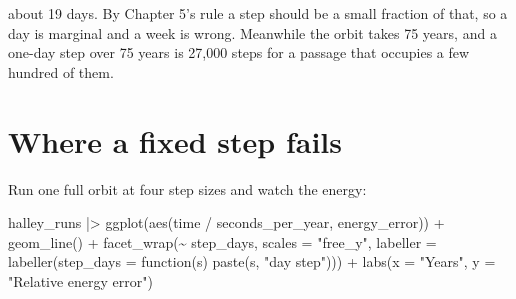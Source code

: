 \documentclass[
  10.5pt,
  letterpaper,
]{scrbook}
\newenvironment{Shaded}{\begin{snugshade}}{\end{snugshade}}
\newcommand{\AttributeTok}[1]{\textcolor[rgb]{0.00,0.00,0.00}{#1}}
\newcommand{\ControlFlowTok}[1]{\textcolor[rgb]{0.00,0.00,0.00}{#1}}
\newcommand{\DecValTok}[1]{\textcolor[rgb]{0.00,0.00,0.00}{#1}}
\newcommand{\FunctionTok}[1]{\textcolor[rgb]{0.00,0.00,0.00}{#1}}
\newcommand{\NormalTok}[1]{\textcolor[rgb]{0.00,0.00,0.00}{#1}}
\newcommand{\OtherTok}[1]{\textcolor[rgb]{0.00,0.00,0.00}{#1}}
\newcommand{\SpecialCharTok}[1]{\textcolor[rgb]{0.00,0.00,0.00}{#1}}
\newcommand{\StringTok}[1]{\textcolor[rgb]{0.00,0.00,0.00}{#1}}
\theoremstyle{plain}
\theoremstyle{remark}
\begin{document}
about 19 days. By Chapter 5's rule a step should be a small fraction of
that, so a day is marginal and a week is wrong. Meanwhile the orbit
takes 75 years, and a one-day step over 75 years is 27,000 steps for a
passage that occupies a few hundred of them.

\section{Where a fixed step fails}\label{where-a-fixed-step-fails}

Run one full orbit at four step sizes and watch the energy:

\begin{Shaded}
\end{Shaded}

\begin{Shaded}
\begin{Highlighting}[]
\NormalTok{halley\_runs }\SpecialCharTok{|\textgreater{}}
  \FunctionTok{ggplot}\NormalTok{(}\FunctionTok{aes}\NormalTok{(time }\SpecialCharTok{/}\NormalTok{ seconds\_per\_year, energy\_error)) }\SpecialCharTok{+}
  \FunctionTok{geom\_line}\NormalTok{() }\SpecialCharTok{+}
  \FunctionTok{facet\_wrap}\NormalTok{(}\SpecialCharTok{\textasciitilde{}}\NormalTok{ step\_days, }\AttributeTok{scales =} \StringTok{"free\_y"}\NormalTok{,}
             \AttributeTok{labeller =} \FunctionTok{labeller}\NormalTok{(}\AttributeTok{step\_days =} \ControlFlowTok{function}\NormalTok{(s) }\FunctionTok{paste}\NormalTok{(s, }\StringTok{"day step"}\NormalTok{))) }\SpecialCharTok{+}
  \FunctionTok{labs}\NormalTok{(}\AttributeTok{x =} \StringTok{"Years"}\NormalTok{, }\AttributeTok{y =} \StringTok{"Relative energy error"}\NormalTok{)}
\end{Highlighting}
\end{Shaded}
\end{document}

